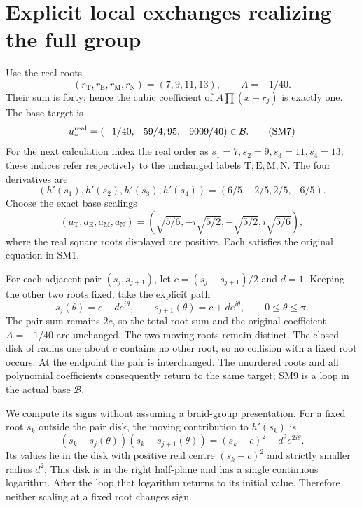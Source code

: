 \documentclass[11pt]{article}
\begin{document}
\section{Explicit local exchanges realizing the full group}
Use the real roots
\[
 (r_{\mathrm T},r_{\mathrm E},r_{\mathrm M},r_{\mathrm N})
 =(7,9,11,13),\qquad A=-1/40.
\]
Their sum is forty; hence the cubic coefficient of
$A\prod(x-r_j)$ is exactly one. The base target is
\begin{equation}
 u_*^{\rm real}=(-1/40,-59/4,95,-9009/40)\in\mathcal B.
 \tag{SM7}
\end{equation}
For the next calculation index the real order as
$s_1=7,s_2=9,s_3=11,s_4=13$; these indices refer respectively
to the unchanged labels $\mathrm T,\mathrm E,\mathrm M,\mathrm N$.
The four derivatives are
\[
 (h'(s_1),h'(s_2),h'(s_3),h'(s_4))
       =(6/5,-2/5,2/5,-6/5).
\]
Choose the exact base scalings
\begin{equation}
 (a_{\mathrm T},a_{\mathrm E},a_{\mathrm M},a_{\mathrm N})
 =\left(\sqrt{5/6},-i\sqrt{5/2},-\sqrt{5/2},i\sqrt{5/6}\right),
 \tag{SM8}
\end{equation}
where the real square roots displayed are positive. Each satisfies
the original equation in SM1.

For each adjacent pair $(s_j,s_{j+1})$, let
$c=(s_j+s_{j+1})/2$ and $d=1$. Keeping the other two roots fixed,
take the explicit path
\begin{equation}
 s_j(\theta)=c-d e^{i\theta},\qquad
 s_{j+1}(\theta)=c+d e^{i\theta},\qquad0\le\theta\le\pi.
 \tag{SM9}
\end{equation}
The pair sum remains $2c$, so the total root sum and the original
coefficient $A=-1/40$ are unchanged. The two moving roots remain
distinct. The closed disk of radius one about $c$ contains no
other root, so no collision with a fixed root occurs. At the
endpoint the pair is interchanged. The unordered roots and all
polynomial coefficients consequently return to the same target;
SM9 is a loop in the actual base $\mathcal B$.

We compute its signs without assuming a braid-group presentation.
For a fixed root $s_k$ outside the pair disk, the moving contribution
to $h'(s_k)$ is
\[
 (s_k-s_j(\theta))(s_k-s_{j+1}(\theta))
       =(s_k-c)^2-d^2e^{2i\theta}.
\]
Its values lie in the disk with positive real centre $(s_k-c)^2$
and strictly smaller radius $d^2$. This disk is in the right
half-plane and has a single continuous logarithm. After the loop
that logarithm returns to its initial value. Therefore neither
scaling at a fixed root changes sign.
\end{document}
